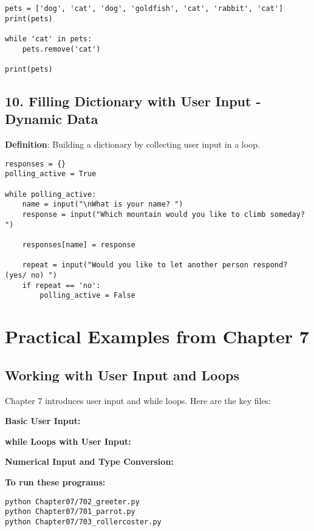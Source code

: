 \begin{lstlisting}
pets = ['dog', 'cat', 'dog', 'goldfish', 'cat', 'rabbit', 'cat']
print(pets)

while 'cat' in pets:
    pets.remove('cat')

print(pets)
\end{lstlisting}

\subsection*{10. Filling Dictionary with User Input - Dynamic Data}
\textbf{Definition}: Building a dictionary by collecting user input in a loop.

\begin{lstlisting}
responses = {}
polling_active = True

while polling_active:
    name = input("\nWhat is your name? ")
    response = input("Which mountain would you like to climb someday? ")
    
    responses[name] = response
    
    repeat = input("Would you like to let another person respond? (yes/ no) ")
    if repeat == 'no':
        polling_active = False
\end{lstlisting}

\section*{Practical Examples from Chapter 7}

\subsection*{Working with User Input and Loops}
Chapter 7 introduces user input and while loops. Here are the key files:

\textbf{Basic User Input:}


\textbf{while Loops with User Input:}


\textbf{Numerical Input and Type Conversion:}


\textbf{To run these programs:}
\begin{verbatim}
python Chapter07/702_greeter.py
python Chapter07/701_parrot.py
python Chapter07/703_rollercoster.py
\end{verbatim}

